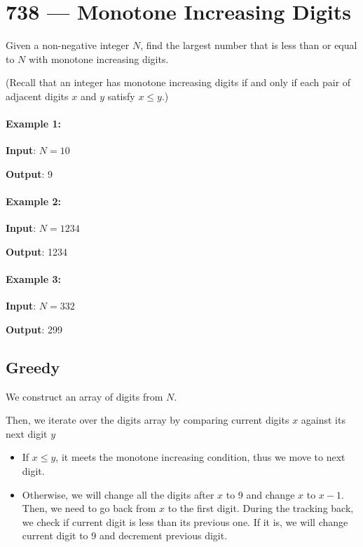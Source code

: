 \section{738 --- Monotone Increasing Digits}
Given a non-negative integer $N$, find the largest number that is less than or equal to $N$ with monotone increasing digits.

(Recall that an integer has monotone increasing digits if and only if each pair of adjacent digits $x$ and $y$ satisfy $x \leq y$.)

\paragraph{Example 1:}
\begin{flushleft}

\textbf{Input}: $N = 10$

\textbf{Output}: 9
\end{flushleft}

\paragraph{Example 2:}
\begin{flushleft}


\textbf{Input}: $N = 1234$

\textbf{Output}: 1234

\end{flushleft}

\paragraph{Example 3:}
\begin{flushleft}


\textbf{Input}: $N = 332$

\textbf{Output}: 299

\end{flushleft}

\subsection{Greedy}
We construct an array of digits from $N$.

Then, we iterate over the digits array by comparing current digits $x$ against its next digit $y$

\begin{itemize}
\item If $x\leq y$, it meets the monotone increasing condition, thus we move to next digit.
\item Otherwise, we will change all the digits after $x$ to 9 and change $x$ to $x-1$. Then, we need to go back from $x$ to the first digit. During the tracking back, we check if current digit is less than its previous one. If it is, we will change current digit to 9 and decrement previous digit.
\end{itemize}

